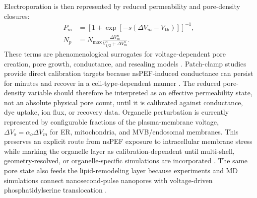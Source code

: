 \documentclass[Afour,sagev,times]{sagej}
\begin{document}
Electroporation is then represented by reduced permeability and pore-density closures:
\[
\begin{aligned}
P_m &= \left[1+\exp[-s(\Delta V_m-V_{\mathrm{th}})]\right]^{-1}, \\
N_p &= N_{\max}
\frac{\Delta V_m^n}{V_{1/2}^n+\Delta V_m^n}.
\end{aligned}
\]
These terms are phenomenological surrogates for voltage-dependent pore creation, pore growth, conductance, and resealing models \cite{vasilkoski2006absolute,krassowska2007modeling}. Patch-clamp studies provide direct calibration targets because nsPEF-induced conductance can persist for minutes and recover in a cell-type-dependent manner \cite{pakhomov2007membrane,pakhomov2007long,nesin2012cell}. The reduced pore-density variable should therefore be interpreted as an effective permeability state, not an absolute physical pore count, until it is calibrated against conductance, dye uptake, ion flux, or recovery data. Organelle perturbation is currently represented by configurable fractions of the plasma-membrane voltage, $\Delta V_o=\alpha_o\Delta V_m$ for ER, mitochondria, and MVB/endosomal membranes. This preserves an explicit route from nsPEF exposure to intracellular membrane stress while marking the organelle layer as calibration-dependent until multi-shell, geometry-resolved, or organelle-specific simulations are incorporated \cite{semenov2013primary,beebe2012transient,baker2024numerical}. The same pore state also feeds the lipid-remodeling layer because experiments and MD simulations connect nanosecond-pulse nanopores with voltage-driven phosphatidylserine translocation \cite{vernier2006nanoporeJACS,vernier2006nanoporePhysBio}.
\end{document}

